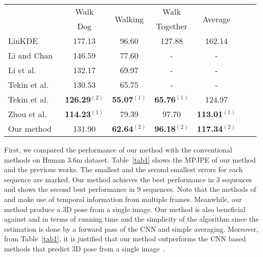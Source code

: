 \documentclass[runningheads]{llncs}
\begin{document}
\begin{table}[t]
\begin{tabular}{ l c c c c c c }
  \multirow{2}{*}{\quad} & Walk & \multirow{2}{*}{Walking} & Walk & \multirow{2}{*}{Average} \\
  & Dog & & Together & \\ \hline
  LinKDE~\cite{h36m_pami}\quad & 177.13 & 96.60 & 127.88 & 162.14 \\
  Li and Chan~\cite{li20143d}\quad & 146.59 & 77.60 & - & - \\
  Li et al.~\cite{li2015maximum}\quad & 132.17 & 69.97 & - & - \\
  Tekin et al.~\cite{tekin2016structured}\quad & 130.53 & 65.75 & - & - \\
  Tekin et al.~\cite{Tekin_2016_CVPR}\quad & \bf 126.29$^{(2)}$ & \bf 55.07$^{(1)}$ & \bf 65.76$^{(1)}$ & 124.97 \\
  Zhou et al.~\cite{Zhou_2016_CVPR}\quad & \bf 114.23$^{(1)}$ & 79.39 & 97.70 & \bf 113.01$^{(1)}$ \\
  Our method\quad & 131.90 & \bf 62.64$^{(2)}$ & \bf 96.18$^{(2)}$ & \bf 117.34$^{(2)}$ \\ \hline

\end{tabular}
\end{table}

First, we compared the performance of our method with the conventional methods on Human 3.6m dataset. Table~\ref{tab1} shows the MPJPE of our method and the previous works. The smallest and the second smallest errors for each sequence are marked. Our method achieves the best performance in 3 sequences and shows the second best performance in 9 sequences. Note that the methods of \cite{Tekin_2016_CVPR} and \cite{Zhou_2016_CVPR} make use of temporal information from multiple frames. Meanwhile, our method produce a 3D pose from a single image. Our method is also beneficial against \cite{Tekin_2016_CVPR} and \cite{Zhou_2016_CVPR} in terms of running time and the simplicity of the algorithm since the estimation is done by a forward pass of the CNN and simple averaging. Moreover, from Table~\ref{tab1}, it is justified that our method outperforms the CNN based methods that predict 3D pose from a single image~\cite{li20143d,li2015maximum,tekin2016structured}.
\end{document}
